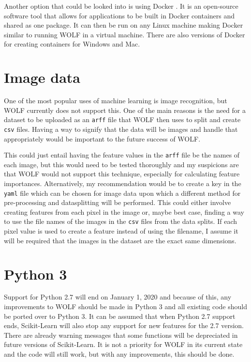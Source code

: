 Another option that could be looked into is using Docker \parencite{Docker}. It is an open-source software tool that allows for applications to be built in Docker containers and shared as one package. It can then be run on any Linux machine making Docker similar to running WOLF in a virtual machine. There are also versions of Docker for creating containers for Windows and Mac.

\section*{Image data}
One of the most popular uses of machine learning is image recognition, but WOLF currently does not support this. One of the main reasons is the need for a dataset to be uploaded as an {\tt arff} file that WOLF then uses to split and create {\tt csv} files. Having a way to signify that the data will be images and handle that appropriately would be important to the future success of WOLF.

This could just entail having the feature values in the {\tt arff} file be the names of each image, but this would need to be tested thoroughly and my suspicions are that WOLF would not support this technique, especially for calculating feature importances. Alternatively, my recommendation would be to create a key in the {\tt yaml} file which can be chosen for image data upon which a different method for pre-processing and datasplitting will be performed. This could either involve creating features from each pixel in the image or, maybe best case, finding a way to use the file names of the images in the {\tt csv} files from the data splits. If each pixel value is used to create a feature instead of using the filename, I assume it will be required that the images in the dataset are the exact same dimensions.
\section*{Python 3}
Support for Python 2.7 will end on January 1, 2020 and because of this, any improvements to WOLF should be made in Python 3 and all existing code should be ported over to Python 3. It can be assumed that when Python 2.7 support ends, Scikit-Learn will also stop any support for new features for the 2.7 version. There are already warning messages that some functions will be depreciated in future versions of Scikit-Learn. It is not a priority for WOLF in its current state and the code will still work, but with any improvements, this should be done.


